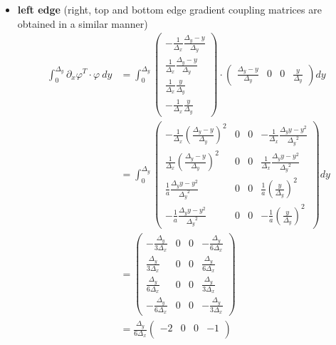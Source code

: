 \documentclass{mc2013}
\newcommand\bs{\boldsymbol}
\newcommand\tf{\varphi}
\renewcommand{\(}{\left(}
\renewcommand{\)}{\right)}
\renewcommand{\[}{\left[}
\renewcommand{\]}{\right]}
\begin{document}
\begin{itemize}
\item {\bf left edge} (right, top and bottom edge gradient coupling matrices are obtained in a similar manner)  %
\begin{equation}
\begin{split}
\int_{0}^{{\Delta _y}} \partial_x \tf^{T} \cdot \tf\ dy &= \int_0^{\Delta _y}
\begin{pmatrix}
-\frac{1}{{\Delta _x}}\frac{{\Delta _y}-y}{{\Delta _y}}\\
\frac{1}{{\Delta _x}} \frac{{\Delta _y}-y}{{\Delta _y}}\\
\frac{1}{{\Delta _x}} \frac{y}{{\Delta _y}}\\
-\frac{1}{{\Delta _x}} \frac{y}{{\Delta _y}}
\end{pmatrix}
\cdot
\begin{pmatrix}
\frac{{\Delta _y}-y}{{\Delta _y}} & 0 & 0 & \frac{y}{{\Delta _y}}
\end{pmatrix}
dy\\
&= \int_0^{\Delta _y} 
\begin{pmatrix}
-\frac{1}{{\Delta _x}} \(\frac{{\Delta _y}-y}{{\Delta _y}}\)^2 & 0 & 0 & -\frac{1}{{\Delta _x}} \frac{{\Delta _y}y-y^2}{{\Delta _y}^2} \\
\frac{1}{{\Delta _x}} \(\frac{{\Delta _y}-y}{{\Delta _y}}\)^2  & 0 & 0 & \frac{1}{{\Delta _x}} \frac{{\Delta _y}y-y^2}{{\Delta _y}^2}\\
\frac{1}{a} \frac{{\Delta _y}y-y^2}{{\Delta _y}^2}   & 0 & 0 & \frac{1}{a} \(\frac{y}{{\Delta _y}}\)^2 \\
-\frac{1}{a} \frac{{\Delta _y}y-y^2}{{\Delta _y}^2}  & 0 & 0 & -\frac{1}{a} \(\frac{y}{{\Delta _y}}\)^2
\end{pmatrix}
dy\\
&= 
\begin{pmatrix}
-\frac{{\Delta _y}}{3{\Delta _x}} & 0 & 0 & -\frac{{\Delta _y}}{6{\Delta _x}} \\
\frac{{\Delta _y}}{3{\Delta _x}} & 0 & 0 & \frac{{\Delta _y}}{6{\Delta _x}} \\
\frac{{\Delta _y}}{6{\Delta _x}} & 0 & 0 & \frac{{\Delta _y}}{3{\Delta _x}} \\
-\frac{{\Delta _y}}{6{\Delta _x}} & 0 & 0 & -\frac{{\Delta _y}}{3{\Delta _x}}
\end{pmatrix}\\
& = \frac{{\Delta _y}}{6{\Delta _x}}
\begin{pmatrix}
-2 & 0 & 0 & -1 \\

\end{pmatrix}
\end{split}
\end{equation}
\end{itemize}
\end{document}
